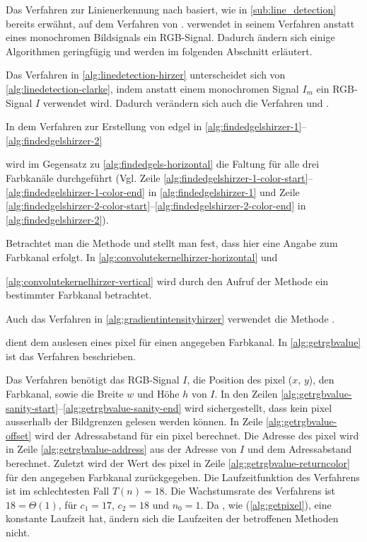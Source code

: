 Das Verfahren zur Linienerkennung nach \citeauthor{hirzer08} basiert, wie in \autoref{sub:line_detection} bereits
 erwähnt, auf dem Verfahren von \citeauthor{clarke96}. \citeauthor{hirzer08} verwendet in seinem Verfahren anstatt
 eines monochromen Bildsignals ein RGB-Signal. Dadurch ändern sich einige Algorithmen geringfügig und werden im
 folgenden Abschnitt erläutert.

Das Verfahren in \autoref{alg:linedetection-hirzer} unterscheidet sich von \autoref{alg:linedetection-clarke}, indem
 anstatt einem monochromen Signal $I_m$ ein RGB-Signal $I$ verwendet wird. Dadurch verändern sich auch die Verfahren
  und .

In dem Verfahren zur Erstellung von \gls{edgel} in \autoref{alg:findedgelshirzer-1}--\autoref{alg:findedgelshirzer-2}

wird im Gegensatz zu \autoref{alg:findedgels-horizontal} die Faltung für alle drei Farbkanäle durchgeführt (Vgl. Zeile
 \ref{alg:findedgelshirzer-1-color-start}--\ref{alg:findedgelshirzer-1-color-end} in \autoref{alg:findedgelshirzer-1}
 und Zeile \ref{alg:findedgelshirzer-2-color-start}--\ref{alg:findedgelshirzer-2-color-end} in
 \autoref{alg:findedgelshirzer-2}).

Betrachtet man die Methode  und  stellt man fest, dass hier eine
 Angabe zum Farbkanal erfolgt. In \autoref{alg:convolutekernelhirzer-horizontal} und

 \autoref{alg:convolutekernelhirzer-vertical} wird durch den Aufruf der Methode  ein bestimmter
 Farbkanal betrachtet.

Auch das Verfahren  in \autoref{alg:gradientintensityhirzer} verwendet die Methode
 .


 dient dem auslesen eines \gls{pixel} für einen angegeben Farbkanal. In \autoref{alg:getrgbvalue} ist das Verfahren beschrieben.

Das Verfahren benötigt das RGB-Signal $I$, die Position des \gls{pixel} ($x$, $y$), den Farbkanal, sowie die Breite $w$
 und Höhe $h$ von $I$. In den Zeilen \ref{alg:getrgbvalue-sanity-start}--\ref{alg:getrgbvalue-sanity-end} wird
 sichergestellt, dass kein \gls{pixel} ausserhalb der Bildgrenzen gelesen werden können. In Zeile
 \ref{alg:getrgbvalue-offset} wird der Adressabstand für ein \gls{pixel} berechnet. Die Adresse des \gls{pixel} wird in
 Zeile \ref{alg:getrgbvalue-address} aus der Adresse von $I$ und dem Adressabstand berechnet. Zuletzt wird der Wert des
 \gls{pixel} in Zeile \ref{alg:getrgbvalue-returncolor} für den angegeben Farbkanal zurückgegeben. Die Laufzeitfunktion
 des Verfahrens ist im schlechtesten Fall $T(n) = 18$. Die Wachstumsrate des Verfahrens ist $18 = \Theta(1)$, für
 $c_{1} = 17$, $c_{2} = 18$ und $n_{0} = 1$. Da , wie 
 (\autoref{alg:getpixel}), eine konstante Laufzeit hat, ändern sich die Laufzeiten der betroffenen Methoden nicht.

